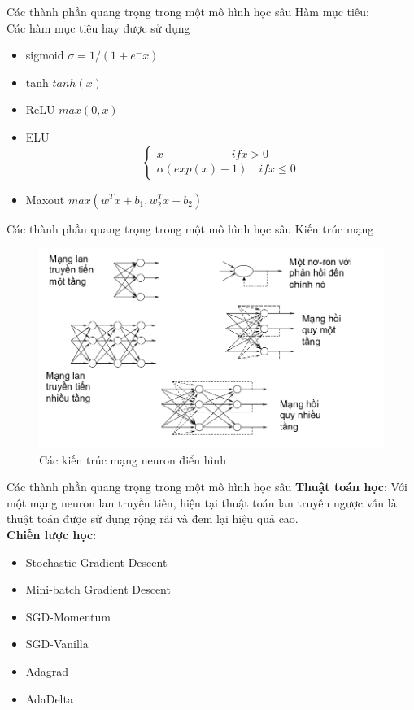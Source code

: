 \documentclass[compress]{beamer}
\begin{document}
\begin{frame}{Các thành phần quang trọng trong một mô hình học sâu} 
Hàm mục tiêu:\\ Các hàm mục tiêu hay được sử dụng \begin{itemize}
\item sigmoid $\sigma =1/(1+e^-x)$
\item tanh $ tanh(x)$
\item ReLU $ max(0,x)$
\item ELU \abovedisplayskip=0pt\relax
\begin{equation}
\begin{cases}
x \qquad \qquad \qquad  if x>0\\ \alpha (exp(x)-1) \quad if x \leq 0
\end{cases}
\end{equation}
\item Maxout $max(w_1^T x+b_1,w_2^T x+b_2) $

\end{itemize}

\end{frame}
\begin{frame}{Các thành phần quang trọng trong một mô hình học sâu}
Kiến trúc mạng
\begin{figure}[H]
\includegraphics[scale=0.3]{archneuron.png}
\caption{Các kiến trúc mạng neuron điển hình}
\end{figure}
\end{frame}
\begin{frame}{Các thành phần quang trọng trong một mô hình học sâu}
\textbf{Thuật toán học}: Với một mạng neuron lan truyền tiến, hiện tại thuật toán lan truyền ngược vẫn là thuật toán được sử dụng rộng rãi và đem lại hiệu quả cao.\\

\textbf{Chiến lược học}:
\begin{itemize}
\item Stochastic Gradient Descent
\item Mini-batch Gradient Descent
\item SGD-Momentum
\item SGD-Vanilla
\item Adagrad
\item AdaDelta
\end{itemize}

\end{frame}
\end{document}

